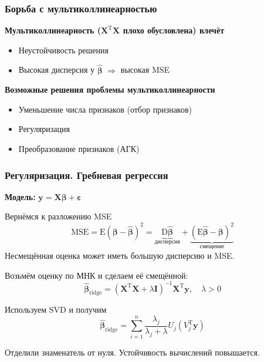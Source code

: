 \documentclass[ucs, notheorems, handout]{beamer}
\newcommand{\betah}{\hat{\bm \beta}}
\newcommand{\betaa}{\bm{\beta}}
\newcommand{\epss}{\bm{\varepsilon}}
\newcommand{\E}{\mathrm{E}}
\newcommand{\XT}{{\bm{X}}^{\mathrm{T}}}
\newcommand{\X}{\bm{X}}
\begin{document}
	\begin{frame}
	    \frametitle{Борьба с мультиколлинеарностью}
	\begin{centering}
		\textbf{Мультиколлинеарность ($\XT \X$ плохо обусловлена) влечёт}
	\end{centering}
	
	\begin{itemize}
		\item Неустойчивость решения
		\item Высокая дисперсия у $\betah$ $\Rightarrow$ высокая MSE
	\end{itemize}
	\vspace{0.5cm}
	\begin{centering}
		\textbf{Возможные решения проблемы мультиколлинеарности}
	\end{centering}
	
	
	\begin{itemize}
		\item Уменьшение числа признаков (отбор признаков)
		\item Регуляризация
		\item Преобразование признаков (АГК)
	\end{itemize}
	\end{frame}
	
	
	\begin{frame}
	    \frametitle{Регуляризация. Гребневая регрессия}
	    \textbf{Модель:} $\bm y = \X \betaa + \epss$
		
		Вернёмся к разложению MSE	
	$$\mathrm{MSE} = \E(\betaa - \betah)^2 = \underbrace{\mathrm D \betah}_{\text{дисперсия}} + \underbrace{(\mathrm E \betah - \betaa)^2}_{\text{смещение}}$$
	Несмещённая оценка может иметь большую дисперсию и MSE.
		
		Возьмём оценку по МНК и сделаем её смещённой:
		$$\betah_{\text{ridge}} = (\XT \X + \lambda \mathbf I)^{-1}\XT\bm y,\quad \lambda > 0$$
		
		Используем SVD и получим
		$$\betah_{\text{ridge}} = \sum_{i = 1}^n \frac{\lambda_j}{\lambda_j + \lambda} U_j(V_j^\mathrm T\bm y)$$
	
		Отделили знаменатель от нуля. Устойчивость вычислений повышается.
	\end{frame}
	
\end{document}
